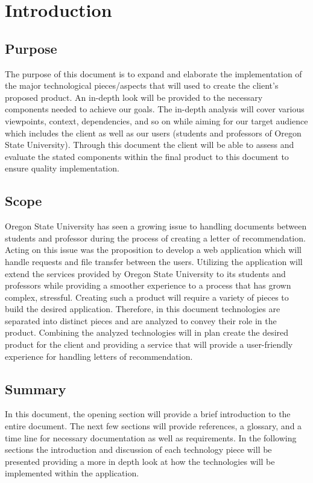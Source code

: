 \documentclass[onecolumn, draftclsnofoot,10pt, compsoc]{IEEEtran}
\begin{document}
\newpage
{}
\tableofcontents
\clearpage

\section{Introduction}
\subsection{Purpose}
The purpose of this document is to expand and elaborate the implementation of the major technological pieces/aspects that will used to create the client’s proposed product.  An in-depth look will be provided to the necessary components needed to achieve our goals. The in-depth analysis will cover various viewpoints, context, dependencies, and so on while aiming for our target audience which includes the client as well as our users (students and professors of Oregon State University). Through this document the client will be able to assess and evaluate the stated components within the final product to this document to ensure quality implementation.

\subsection{Scope}
Oregon State University has seen a growing issue to handling documents between students and professor during the process of creating a letter of recommendation. Acting on this issue was the proposition to develop a web application which will handle requests and file transfer between the users. Utilizing the application will extend the services provided by Oregon State University to its students and professors while providing a smoother experience to a process that has grown complex, stressful. Creating such a product will require a variety of pieces to build the desired application. Therefore, in this document technologies are separated into distinct pieces and are analyzed to convey their role in the product. Combining the analyzed technologies will in plan create the desired product for the client and providing a service that will provide a user-friendly experience for handling letters of recommendation. 

\subsection{Summary}
In this document, the opening section will provide a brief introduction to the entire document. The next few sections will provide references, a glossary, and a time line for necessary documentation as well as requirements. In the following sections the introduction and discussion of each technology piece will be presented providing a more in depth look at how the technologies will be implemented within the application.
\end{document}

